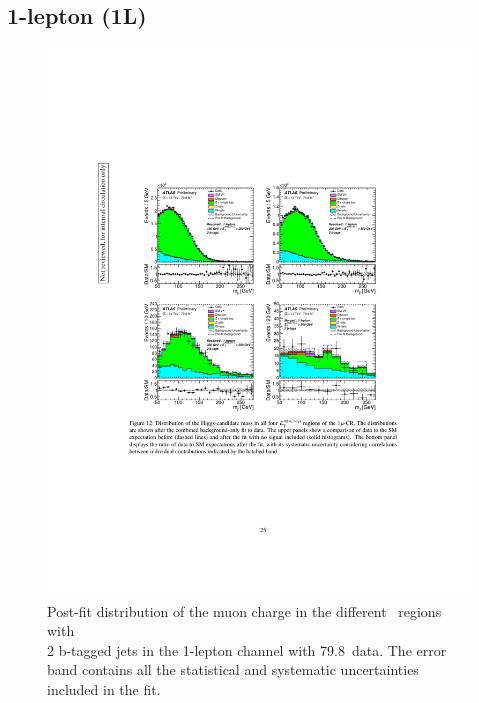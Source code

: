 \subsection{1-lepton (1L)}
\begin{figure}[H]
    \includegraphics[width=15cm,trim={4cm 9cm 4cm 6cm}, clip]{chapters/c9/figures/post-fit-1lep.pdf}

  \caption{Post-fit distribution of the muon charge in the different \met~regions with \\2 b-tagged jets in the 1-lepton channel with 79.8~\ifb data. The error band contains all the statistical and systematic uncertainties included in the fit.}
  \label{fig:Data_MC_CR1_mu_charge_2b_postfit}
\end{figure}

